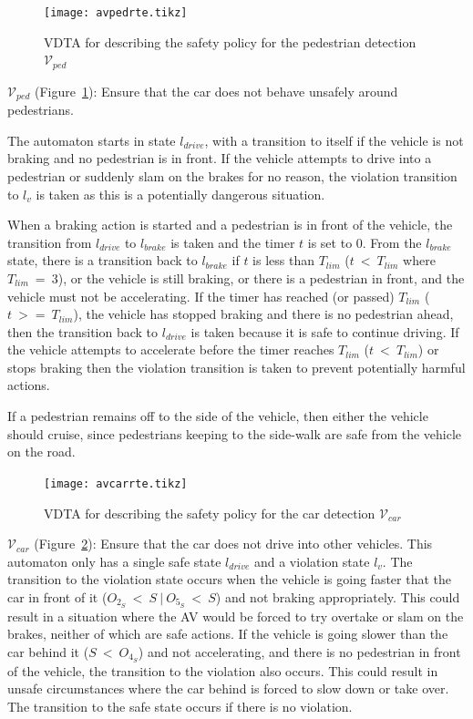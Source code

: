 \begin{figure}[h]
	\centering
	\texttt{[image: avpedrte.tikz]}
	\caption{\ac{VDTA} for describing the safety policy for the pedestrian detection $\mathcal{V}_{ped}$\label{fig:avpedrte}}
\end{figure}

$\mathcal{V}_{ped}$ (Figure~\ref{fig:avpedrte}): Ensure that the car does not behave unsafely around pedestrians. 

The automaton starts in state $l_{drive}$, with a transition to itself if the vehicle is not braking and no pedestrian is in front.
If the vehicle attempts to drive into a pedestrian or suddenly slam on the brakes for no reason, the violation transition to $l_v$ is taken as this is a potentially dangerous situation.
 
When a braking action is started and a pedestrian is in front of the vehicle, the transition from $l_{drive}$ to $l_{brake}$ is taken and the timer $t$ is set to 0.
From the $l_{brake}$ state, there is a transition back to $l_{brake}$ if $t$ is less than $T_{lim}$ ($t~<~T_{lim}$ where $T_{lim}~=~3$), or the vehicle is still braking, or there is a pedestrian in front, and the vehicle must not be accelerating.
If the timer has reached (or passed) $T_{lim}$ ($t~>=~T_{lim}$), the vehicle has stopped braking and there is no pedestrian ahead, then the transition back to $l_{drive}$ is taken because it is safe to continue driving.
If the vehicle attempts to accelerate before the timer reaches $T_{lim}$ ($t~<~T_{lim}$) or stops braking then the violation transition is taken to prevent potentially harmful actions.

If a pedestrian remains off to the side of the vehicle, then either the vehicle should cruise, since pedestrians keeping to the side-walk are safe from the vehicle on the road.

\begin{figure}[h]
	\centering
	\texttt{[image: avcarrte.tikz]}
	\caption{\ac{VDTA} for describing the safety policy for the car detection $\mathcal{V}_{car}$\label{fig:avcarrte}}
\end{figure}

$\mathcal{V}_{car}$ (Figure~\ref{fig:avcarrte}): Ensure that the car does not drive into other vehicles. 
This automaton only has a single safe state $l_{drive}$ and a violation state $l_v$.
The transition to the violation state occurs when the vehicle is going faster that the car in front of it ($O_{2_S}~<~S~|~O_{5_S}~<~S$) and not braking appropriately.
This could result in a situation where the \ac{AV} would be forced to try overtake or slam on the brakes, neither of which are safe actions.
If the vehicle is going slower than the car behind it ($S~<~O_{4_S}$) and not accelerating, and there is no pedestrian in front of the vehicle, the transition to the violation also occurs.
This could result in unsafe circumstances where the car behind is forced to slow down or take over.
The transition to the safe state occurs if there is no violation.

